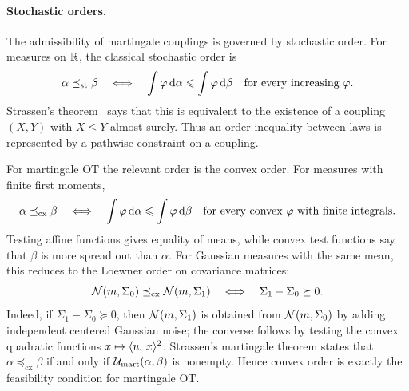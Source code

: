 \paragraph{Stochastic orders.}
The admissibility of martingale couplings is governed by stochastic order. For measures on $\mathbb{R}$, the classical stochastic order is
\[
	\alpha\preceq_{\mathrm{st}}\beta
	\quad\Longleftrightarrow\quad
	\int \varphi\,\mathrm{d}\alpha\leqslant\int \varphi\,\mathrm{d}\beta
	\quad\text{for every increasing }\varphi .
\]
Strassen's theorem~\cite{Strassen1965} says that this is equivalent to the existence of a coupling $(X,Y)$ with $X\leq Y$ almost surely. Thus an order inequality between laws is represented by a pathwise constraint on a coupling.

For martingale OT the relevant order is the convex order. For measures with finite first moments,
\[
	\alpha\preceq_{\mathrm{cx}}\beta
	\quad\Longleftrightarrow\quad
	\int \varphi\,\mathrm{d}\alpha\leqslant\int \varphi\,\mathrm{d}\beta
	\quad\text{for every convex }\varphi\text{ with finite integrals}.
\]
Testing affine functions gives equality of means, while convex test functions say that $\beta$ is more spread out than $\alpha$. For Gaussian measures with the same mean, this reduces to the Loewner order on covariance matrices:
\[
	\mathcal{N}(m,\Sigma_0)\preceq_{\mathrm{cx}}\mathcal{N}(m,\Sigma_1)
	\quad\Longleftrightarrow\quad
	\Sigma_1-\Sigma_0\succeq0 .
\]
Indeed, if $\Sigma_1-\Sigma_0\succeq0$, then $\mathcal{N}(m,\Sigma_1)$ is obtained from $\mathcal{N}(m,\Sigma_0)$ by adding independent centered Gaussian noise; the converse follows by testing the convex quadratic functions $x\mapsto\langle u,\,x\rangle^2$.
Strassen's martingale theorem states that $\alpha\preceq_{\mathrm{cx}}\beta$ if and only if $\mathcal{U}_{\mathrm{mart}}(\alpha,\beta)$ is nonempty. Hence convex order is exactly the feasibility condition for martingale OT.

